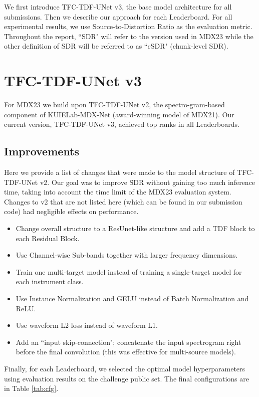 \documentclass[10pt]{article}
\begin{document}
We first introduce TFC-TDF-UNet v3, the base model architecture for all submissions. Then we describe our approach for each Leaderboard. 
For all experimental results, we use Source-to-Distortion Ratio as the evaluation metric. Throughout the report, ``SDR" will refer to the version used in MDX23 while the other definition of SDR\cite{sdr} will be referred to as ``cSDR" (chunk-level SDR). 


\section{TFC-TDF-UNet v3}
\label{sec:v3}
For MDX23 we build upon  TFC-TDF-UNet v2, the spectro-\newline gram-based component of KUIELab-MDX-Net\cite{mdxnet} (award-winning model of MDX21). Our current version, TFC-TDF-UNet v3, achieved top ranks in all Leaderboards. 

\subsection{Improvements}
\label{ssec:v3_improvements}
Here we provide a list of changes that were made to the model structure of TFC-TDF-UNet v2. Our goal was to improve SDR without gaining too much inference time, taking into account the time limit of the MDX23 evaluation system. Changes to v2 that are not listed here (which can be found in our submission code) had negligible effects on performance.

\begin{itemize}
  \item Change overall structure to a ResUnet\cite{ResUnet}-like structure and add a TDF block\cite{mdxnet,tdf} to each Residual Block.
  \item Use Channel-wise Sub-bands\cite{cws} together with larger frequency dimensions.
  \item Train one multi-target model instead of training a single-target model for each instrument class.
  \item Use Instance Normalization and GELU instead of Batch Normalization and ReLU.
  \item Use waveform L2 loss instead of waveform L1.
  \item Add an ``input skip-connection"; concatenate the input spectrogram right before the final convolution (this was effective for multi-source models).
\end{itemize}

Finally, for each Leaderboard, we selected the optimal model hyperparameters using evaluation results on the challenge public set. The final configurations are in Table \ref{tab:cfg}.
\end{document}
